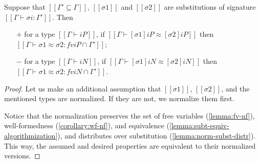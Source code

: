 \begin{lemma}[]
  Suppose that $[[Γ' ⊆ Γ]]$,
  $[[σ1]]$ and $[[σ2]]$ are substitutions of signature $[[Γ ⊢ σi : Γ']]$.
  Then 
  \begin{enumerate}
    \item [$+$] for a type $[[Γ ⊢ iP]]$, if $[[Γ ⊢ [σ1]iP ≈ [σ2]iP]]$ then 
    $[[Γ ⊢ σ1 ≈ σ2 : fv iP ∩ Γ']]$;
    \item [$-$] for a type $[[Γ ⊢ iN]]$, if $[[Γ ⊢ [σ1]iN ≈ [σ2]iN]]$ then
    $[[Γ ⊢ σ1 ≈ σ2 : fv iN ∩ Γ']]$.
  \end{enumerate}
\end{lemma}
\begin{proof}
  Let us make an additional assumption that $[[σ1]]$, $[[σ2]]$, 
  and the mentioned types are normalized. If they are not,
  we normalize them first.
  
  Notice that the normalization preserves
  the set of free variables (\cref{lemma:fv-nf}),
  well-formedness (\cref{corollary:wf-nf}), 
  and equivalence (\cref{lemma:subt-equiv-algorithmization}), 
  and distributes over substitution (\cref{lemma:norm-subst-distr}). 
  This way, the assumed and desired properties are equivalent to their 
  normalized versions.


\end{proof}
